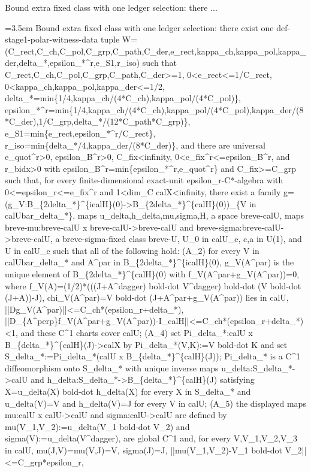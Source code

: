 \documentclass{article}
\newcommand{\step}[1]{\par\noindent\hangindent=3.5em\hangafter=1%
  \makebox[3.5em][l]{\textbf{#1.}}}
\begin{document}
\begin{proofbox}{Bound extra fixed class with one ledger selection: there ...}
\step{1} Bound extra fixed class with one ledger selection: there exist one def-stage1-polar-witness-data tuple W=(C\_rect,C\_ch,C\_pol,C\_grp,C\_path,C\_der,e\_rect,kappa\_ch,kappa\_pol,kappa\_der,delta\_*,epsilon\_*\textasciicircum{}r,e\_S1,r\_iso) such that C\_rect,C\_ch,C\_pol,C\_grp,C\_path,C\_der>=1, 0<e\_rect<=1/C\_rect, 0<kappa\_ch,kappa\_pol,kappa\_der<=1/2, delta\_*=min\{1/4,kappa\_ch/(4*C\_ch),kappa\_pol/(4*C\_pol)\}, epsilon\_*\textasciicircum{}r=min\{1/4,kappa\_ch/(4*C\_ch),kappa\_pol/(4*C\_pol),kappa\_der/(8*C\_der),1/C\_grp,delta\_*/(12*C\_path*C\_grp)\}, e\_S1=min\{e\_rect,epsilon\_*\textasciicircum{}r/C\_rect\}, r\_iso=min\{delta\_*/4,kappa\_der/(8*C\_der)\}, and there are universal e\_quot\textasciicircum{}r>0, epsilon\_B\textasciicircum{}r>0, C\_fix<infinity, 0<e\_fix\textasciicircum{}r<=epsilon\_B\textasciicircum{}r, and r\_bidx>0 with epsilon\_B\textasciicircum{}r=min\{epsilon\_*\textasciicircum{}r,e\_quot\textasciicircum{}r\} and C\_fix>=C\_grp such that, for every finite-dimensional exact-unit epsilon\_r-C*-algebra with 0<=epsilon\_r<=e\_fix\textasciicircum{}r and 1<dim\_C calX<infinity, there exist a family g=(g\_V:B\_\{2delta\_*\}\textasciicircum{}\{icalH\}(0)->B\_\{2delta\_*\}\textasciicircum{}\{calH\}(0))\_\{V in calUbar\_delta\_*\}, maps u\_delta,h\_delta,mu,sigma,H, a space breve-calU, maps breve-mu:breve-calU x breve-calU->breve-calU and breve-sigma:breve-calU->breve-calU, a breve-sigma-fixed class breve-U, U\_0 in calU\_e, c,a in U(1), and U in calU\_e such that all of the following hold: (A\_2) for every V in calUbar\_delta\_* and A\textasciicircum{}par in B\_\{2delta\_*\}\textasciicircum{}\{icalH\}(0), g\_V(A\textasciicircum{}par) is the unique element of B\_\{2delta\_*\}\textasciicircum{}\{calH\}(0) with f\_V(A\textasciicircum{}par+g\_V(A\textasciicircum{}par))=0, where f\_V(A)=(1/2)*(((J+A\textasciicircum{}dagger) bold-dot V\textasciicircum{}dagger) bold-dot (V bold-dot (J+A))-J), chi\_V(A\textasciicircum{}par)=V bold-dot (J+A\textasciicircum{}par+g\_V(A\textasciicircum{}par)) lies in calU, ||Dg\_V(A\textasciicircum{}par)||<=C\_ch*(epsilon\_r+delta\_*), ||D\_\{A\textasciicircum{}perp\}f\_V(A\textasciicircum{}par+g\_V(A\textasciicircum{}par))-I\_calH||<=C\_ch*(epsilon\_r+delta\_*)<1, and these C\textasciicircum{}1 charts cover calU; (A\_4) set Pi\_delta\_*:calU x B\_\{delta\_*\}\textasciicircum{}\{calH\}(J)->calX by Pi\_delta\_*(V,K):=V bold-dot K and set S\_delta\_*:=Pi\_delta\_*(calU x B\_\{delta\_*\}\textasciicircum{}\{calH\}(J)); Pi\_delta\_* is a C\textasciicircum{}1 diffeomorphism onto S\_delta\_* with unique inverse maps u\_delta:S\_delta\_*->calU and h\_delta:S\_delta\_*->B\_\{delta\_*\}\textasciicircum{}\{calH\}(J) satisfying X=u\_delta(X) bold-dot h\_delta(X) for every X in S\_delta\_* and u\_delta(V)=V and h\_delta(V)=J for every V in calU; (A\_5) the displayed maps mu:calU x calU->calU and sigma:calU->calU are defined by mu(V\_1,V\_2):=u\_delta(V\_1 bold-dot V\_2) and sigma(V):=u\_delta(V\textasciicircum{}dagger), are global C\textasciicircum{}1 and, for every V,V\_1,V\_2,V\_3 in calU, mu(J,V)=mu(V,J)=V, sigma(J)=J, ||mu(V\_1,V\_2)-V\_1 bold-dot V\_2||<=C\_grp*epsilon\_r, 
\end{proofbox}
\end{document}
